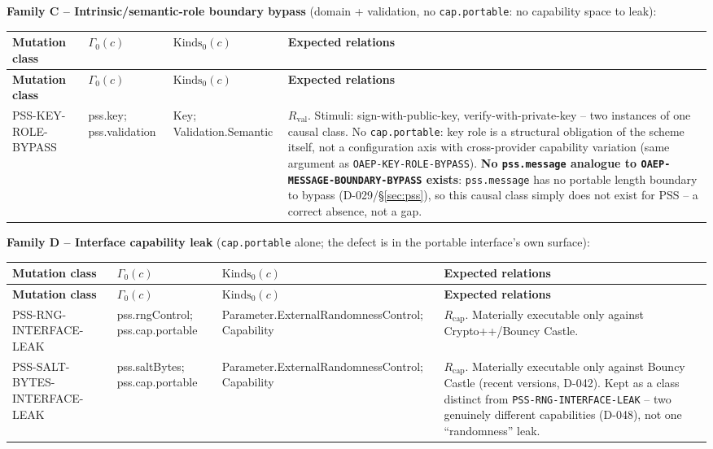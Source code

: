 \documentclass[11pt,a4paper]{article}
\begin{document}
\textbf{Family C -- Intrinsic/semantic-role boundary bypass} (domain + validation, no \texttt{cap.portable}: no capability space to leak):
\begin{longtable}{p{}p{}p{}p{}}
\toprule
\textbf{Mutation class} & \textbf{$\Gamma_0(c)$} & \textbf{$\text{Kinds}_0(c)$} & \textbf{Expected relations}\\
\midrule\endfirsthead
\toprule
\textbf{Mutation class} & \textbf{$\Gamma_0(c)$} & \textbf{$\text{Kinds}_0(c)$} & \textbf{Expected relations}\\
\midrule\endhead
PSS-KEY-ROLE-BYPASS & pss.key; pss.validation & Key; Validation.Semantic & $R_{\text{val}}$. Stimuli: sign-with-public-key, verify-with-private-key -- two instances of one causal class. No \texttt{cap.portable}: key role is a structural obligation of the scheme itself, not a configuration axis with cross-provider capability variation (same argument as \texttt{OAEP-KEY-ROLE-BYPASS}). \textbf{No \texttt{pss.message} analogue to \texttt{OAEP-MESSAGE-BOUNDARY-BYPASS} exists}: \texttt{pss.message} has no portable length boundary to bypass (D-029/\S\ref{sec:pss}), so this causal class simply does not exist for PSS -- a correct absence, not a gap.\\
\bottomrule
\end{longtable}

\textbf{Family D -- Interface capability leak} (\texttt{cap.portable} alone; the defect is in the portable interface's own surface):
\begin{longtable}{p{}p{}p{}p{}}
\toprule
\textbf{Mutation class} & \textbf{$\Gamma_0(c)$} & \textbf{$\text{Kinds}_0(c)$} & \textbf{Expected relations}\\
\midrule\endfirsthead
\toprule
\textbf{Mutation class} & \textbf{$\Gamma_0(c)$} & \textbf{$\text{Kinds}_0(c)$} & \textbf{Expected relations}\\
\midrule\endhead
PSS-RNG-INTERFACE-LEAK & pss.rngControl; pss.cap.portable & Parameter.ExternalRandomnessControl; Capability & $R_{\text{cap}}$. Materially executable only against Crypto++/Bouncy Castle.\\
PSS-SALT-BYTES-INTERFACE-LEAK & pss.saltBytes; pss.cap.portable & Parameter.ExternalRandomnessControl; Capability & $R_{\text{cap}}$. Materially executable only against Bouncy Castle (recent versions, D-042). Kept as a class distinct from \texttt{PSS-RNG-INTERFACE-LEAK} -- two genuinely different capabilities (D-048), not one ``randomness'' leak.\\
\bottomrule
\end{longtable}
\end{document}

